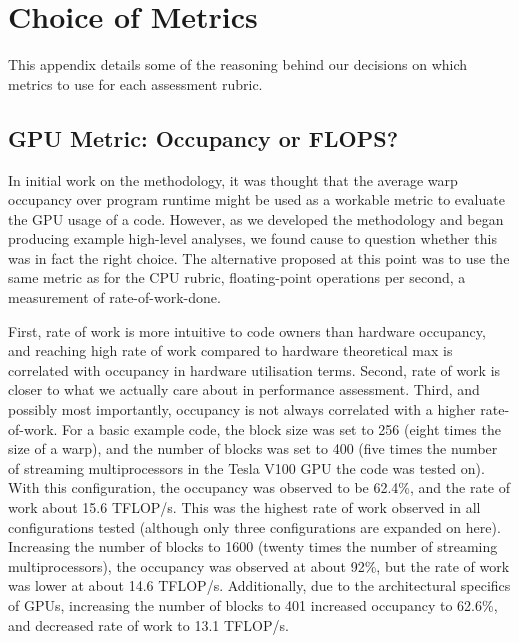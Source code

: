 \chapter{Choice of Metrics}
\label{appendix:metric-choice}

This appendix details some of the reasoning behind our decisions on which metrics to use for each assessment rubric.

\section{GPU Metric: Occupancy or FLOPS?}

In initial work on the methodology, it was thought that the average warp occupancy over program runtime might be used as a workable metric to evaluate the GPU usage of a code.
However, as we developed the methodology and began producing example high-level analyses, we found cause to question whether this was in fact the right choice.
The alternative proposed at this point was to use the same metric as for the CPU rubric, floating-point operations per second, a measurement of rate-of-work-done.

First, rate of work is more intuitive to code owners than hardware occupancy, and reaching high rate of work compared to hardware theoretical max is correlated with occupancy in hardware utilisation terms.
Second, rate of work is closer to what we actually care about in performance assessment.
Third, and possibly most importantly, occupancy is not always correlated with a higher rate-of-work.
For a basic example code, the block size was set to 256 (eight times the size of a warp), and the number of blocks was set to 400 (five times the number of streaming multiprocessors in the Tesla V100 GPU the code was tested on).
With this configuration, the occupancy was observed to be 62.4\%, and the rate of work about 15.6 TFLOP/s. This was the highest rate of work observed in all configurations tested (although only three configurations are expanded on here).
Increasing the number of blocks to 1600 (twenty times the number of streaming multiprocessors), the occupancy was observed at about 92\%, but the rate of work was lower at about 14.6 TFLOP/s.
Additionally, due to the architectural specifics of GPUs, increasing the number of blocks to 401 increased occupancy to 62.6\%, and decreased rate of work to 13.1 TFLOP/s.

